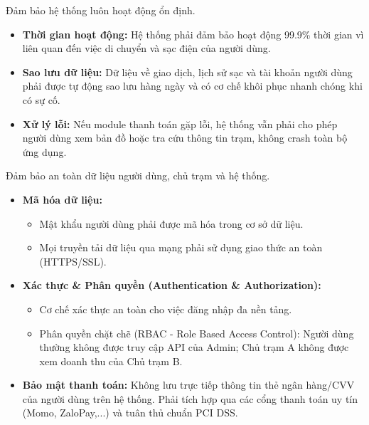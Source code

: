 
Đảm bảo hệ thống luôn hoạt động ổn định.
\begin{itemize}
    \item \textbf{Thời gian hoạt động:} Hệ thống phải đảm bảo hoạt động 99.9\% thời gian vì liên quan đến việc di chuyển và sạc điện của người dùng.
    \item \textbf{Sao lưu dữ liệu:} Dữ liệu về giao dịch, lịch sử sạc và tài khoản người dùng phải được tự động sao lưu hàng ngày và có cơ chế khôi phục nhanh chóng khi có sự cố.
    \item \textbf{Xử lý lỗi:} Nếu module thanh toán gặp lỗi, hệ thống vẫn phải cho phép người dùng xem bản đồ hoặc tra cứu thông tin trạm, không crash toàn bộ ứng dụng.
\end{itemize}


Đảm bảo an toàn dữ liệu người dùng, chủ trạm và hệ thống.
\begin{itemize}
    \item \textbf{Mã hóa dữ liệu:}
    \begin{itemize}
        \item Mật khẩu người dùng phải được mã hóa trong cơ sở dữ liệu.
        \item Mọi truyền tải dữ liệu qua mạng phải sử dụng giao thức an toàn (HTTPS/SSL).
    \end{itemize}
    \item \textbf{Xác thực \& Phân quyền (Authentication \& Authorization):}
    \begin{itemize}
        \item Cơ chế xác thực an toàn cho việc đăng nhập đa nền tảng.
        \item Phân quyền chặt chẽ (RBAC - Role Based Access Control): Người dùng thường không được truy cập API của Admin; Chủ trạm A không được xem doanh thu của Chủ trạm B.
    \end{itemize}
    \item \textbf{Bảo mật thanh toán:} Không lưu trực tiếp thông tin thẻ ngân hàng/CVV của người dùng trên hệ thống. Phải tích hợp qua các cổng thanh toán uy tín (Momo, ZaloPay,...) và tuân thủ chuẩn PCI DSS.
\end{itemize}


